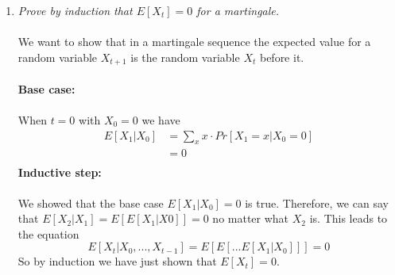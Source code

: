 \documentclass[12pt]{article}
\begin{document}
\begin{enumerate}
\begin{enumerate}
		\newpage
		\item \textit{Prove by induction that $E[X_t] = 0$ for a martingale.}\\
		\\
		We want to show that in a martingale sequence the expected value for a random variable $X_{t+1}$ is the random variable $X_t$ before it.\\
		\\
		\textbf{Base case: }\\
		\\
		When $t=0$ with $X_0 = 0$ we have
			\begin{align*}
			E[X_1|X_0] &= \sum_{x} x \cdot Pr[X_1=x|X_0 = 0]\\
			&=0\\
			\end{align*}
		\textbf{Inductive step: }\\
		\\
		We showed that the base case $E[X_1|X_0] = 0$ is true.  Therefore, we can say that $E[X_2|X_1] = E[E[X_1|X0]] = 0$ no matter what $X_2$ is.   This leads to the equation
			$$
			E[X_t|X_0,...,X_{t-1}] = E[E[...E[X_{1}|X_{0}]]] = 0
			$$
		So by induction we have just shown that $E[X_t] = 0$.
		

\end{enumerate}
\end{enumerate}
\end{document}
